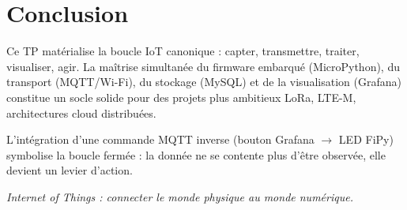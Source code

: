 \documentclass[11pt,a4paper]{article}
\begin{document}
\section{Conclusion}

Ce TP matérialise la boucle IoT canonique : capter, transmettre, traiter, visualiser, agir. La maîtrise simultanée du firmware embarqué (MicroPython), du transport (MQTT/Wi-Fi), du stockage (MySQL) et de la visualisation (Grafana) constitue un socle solide pour des projets plus ambitieux \textemdash{} LoRa, LTE-M, architectures cloud distribuées.

L'intégration d'une commande MQTT inverse (bouton Grafana $\rightarrow$ LED FiPy) symbolise la boucle fermée : la donnée ne se contente plus d'être observée, elle devient un levier d'action.

\vspace{0.5cm}
\begin{center}
{\sffamily\itshape\color{midgray}\large
\og Internet of Things : connecter le monde physique au monde numérique. \fg{}}
\end{center}
\end{document}
